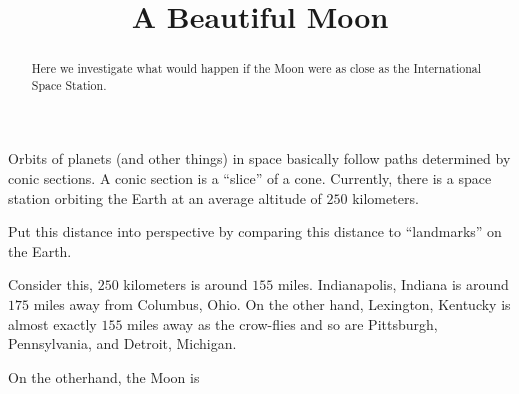 \documentclass{ximera}
\title{A Beautiful Moon}
\begin{document}
\begin{abstract}
Here we investigate what would happen if the Moon were as close as the
International Space Station.
\end{abstract}

Orbits of planets (and other things) in space basically follow paths
determined by conic sections. A conic section is a ``slice'' of a
cone. Currently, there is a space station orbiting the Earth at an average
altitude of $250$ kilometers.

\begin{question}
Put this distance into perspective by comparing this distance to
``landmarks'' on the Earth.
\begin{solution}
\begin{freeResponse}
Consider this, $250$ kilometers is around $155$ miles. Indianapolis,
Indiana is around $175$ miles away from Columbus, Ohio. On the other
hand, Lexington, Kentucky is almost exactly $155$ miles away as the
crow-flies and so are Pittsburgh, Pennsylvania, and Detroit, Michigan.
\end{freeResponse}
\end{solution}
\end{question}


On the otherhand, the Moon is 


\end{document}
